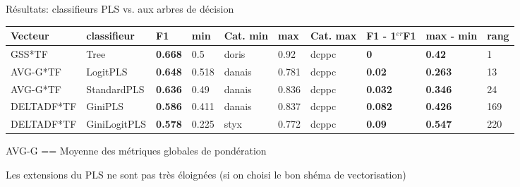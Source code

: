 \begin{frame}{Résultats: classifieurs PLS vs. aux arbres de décision}
\begin{table}[]
\tiny
\label{my-label}
\begin{tabular}{|l|l|l|l|l|l|l|l|l|l|}
\hline
\textbf{Vecteur} & \textbf{classifieur} & \textbf{F1} & \textbf{min} & \textbf{Cat. min} & \textbf{max} & \textbf{Cat. max} & \textbf{F1 - 1$^{er}$F1} & \textbf{max - min} & \textbf{rang} \\ \hline
GSS*TF                 & Tree                & \textbf{0.668}     & 0.5                 & doris                  & 0.92               & dcppc                 & \textbf{0}                    & \textbf{0.42}           & 1             \\ \hline
AVG-G*TF      & LogitPLS         & \textbf{0.648}     & 0.518               & danais                 & 0.781              & dcppc                 & \textbf{0.02}                 & \textbf{0.263}          & 13            \\ \hline
AVG-G*TF      & StandardPLS      & \textbf{0.636}     & 0.49                & danais                 & 0.836              & dcppc                 & \textbf{0.032}                & \textbf{0.346}          & 24            \\ \hline
DELTADF*TF             & GiniPLS          & \textbf{0.586}     & 0.411               & danais                 & 0.837              & dcppc                 & \textbf{0.082}                & \textbf{0.426}          & 169           \\ \hline
DELTADF*TF             & GiniLogitPLS     & \textbf{0.578}     & 0.225               & styx                   & 0.772              & dcppc                 & \textbf{0.09}                 & \textbf{0.547}          & 220           \\ \hline
\end{tabular}
AVG-G == Moyenne des métriques globales de pondération
\end{table}
\scriptsize

Les extensions du PLS ne sont pas très éloignées (si on choisi le bon shéma de vectorisation)

\end{frame}


